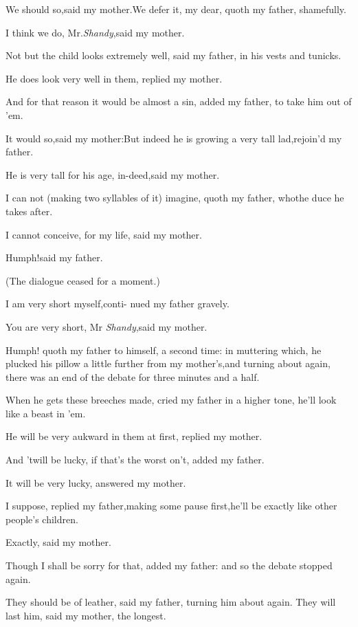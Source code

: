 \documentclass{article}
\begin{document}
We should so,\tsk said my mother.\tsh We defer it, my
dear, quoth my father, shamefully.\tsh

I think we do, Mr.\@ \textit{Shandy},\tsk said my mother.

\tsh Not but the child looks extremely well, said my
father, in his vests and tunicks.\tsh{}

\tsh He does look very well in them,\break
\tsk replied my mother.\tsh

\tsh And for that reason it would be almost a sin,
added my father, to take him out of ’em.\tsh

\tsh It would so,\tsk said my
mother:\break\tsh But indeed he is growing a very tall
lad,\tsk rejoin’d my father.

\tsh He is very tall for his age, in-\break deed,\tsk said my
mother.\tsh

\tsh I can not (making two syllables of it) imagine,
quoth my father, who\break the duce he takes after.\tsh

I cannot conceive, for my life, said my
mother.\tsh{}

Humph!\tsh said my father.

(The dialogue ceased for a moment.)

\tsh I am very short myself,\tsk conti-\break 
nued my father gravely.

You are very short, Mr \textit{Shandy},\tsk\break said my mother.

Humph! quoth my father to himself, a second time: in muttering
which, he plucked his pillow a little further from my
mother’s,\tsk and turning about again, there was an end of
the debate for three minutes and a half.

\tsh When he gets these breeches made, cried my father
in a higher tone, he’ll look like a beast in ’em.

He will be very aukward in them at first, replied my mother.\tsh

\tsh And ’twill be lucky, if that’s\break
the worst on’t, added my father.

It will be very lucky, answered my mother.

I suppose, replied my father,\tsk making some pause
first,\tsk he’ll be exactly like other people’s
children.\tsh

Exactly, said my mother.\tsh

\tsh Though I shall be sorry for that, added my father:
and so the debate stopped again.

\tsh They should be of leather, said my father, turning
him about again.\tsk{}
They will last him, said my mother, the longest.
\end{document}

